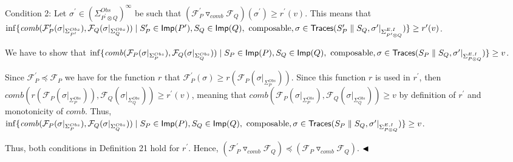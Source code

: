 \documentclass[10pt,a4paper]{article}
\begin{document}
Condition 2: Let $\sigma^{\prime}\in(\Sigma_{P^{\prime}\otimes Q}^{Obs})^{\infty}$ be such that $({{\mathcal{F}_{P}^{\prime}}\mathbin{\triangledown_{\mathit{comb}}}{\mathcal{F}_{Q}}})(\sigma^{\prime})\geq r^{\prime}(v)$. This means that $\inf\{\mathit{comb}(\mathcal{F}_{P}^{\prime}(\sigma|_{\Sigma_{P^{\prime}}^{Obs}}),\mathcal{F}_{Q}(\sigma|_{\Sigma_{Q}^{Obs}}))\mid\\
S_{P}^{\prime}\in\mathsf{Imp}(P^{\prime}),S_{Q}\in\mathsf{Imp}(Q),\text{ composable},\sigma\in\mathsf{Traces}(S_{P}^{\prime}\parallel S_{Q},\sigma^{\prime}|_{\Sigma_{P^{\prime}\otimes Q}^{E,I}})\}\geq r^{\prime}(v)$.\par
 
 
 
We have to show that $\inf\{\mathit{comb}(\mathcal{F}_{P}(\sigma|_{\Sigma_{P}^{Obs}}),\mathcal{F}_{Q}(\sigma|_{\Sigma_{Q}^{Obs}}))\mid\\
S_{P}\in\mathsf{Imp}(P),S_{Q}\in\mathsf{Imp}(Q),\text{ composable},\sigma\in\mathsf{Traces}(S_{P}\parallel S_{Q},\sigma^{\prime}|_{\Sigma_{P\otimes Q}^{E,I}})\}\geq v$.\par
 
 
 
Since $\mathcal{F}_{P}^{\prime}\preceq\mathcal{F}_{P}$ we have for the function $r$ that $\mathcal{F}_{P}^{\prime}(\sigma)\geq r(\mathcal{F}_{P}(\sigma|_{\Sigma_{P}^{Obs}}))$. Since this function $r$ is used in $r^{\prime}$, then $\mathit{comb}(r(\mathcal{F}_{P}(\sigma|_{\Sigma_{P}^{Obs}})),\mathcal{F}_{Q}(\sigma|_{\Sigma_{Q}^{Obs}}))\geq r^{\prime}(v)$, meaning that $\mathit{comb}(\mathcal{F}_{P}(\sigma|_{\Sigma_{P}^{Obs}}),\mathcal{F}_{Q}(\sigma|_{\Sigma_{Q}^{Obs}}))\geq v$ by definition of $r^{\prime}$ and monotonicity of $\mathit{comb}$. Thus, $\inf\{\mathit{comb}(\mathcal{F}_{P}(\sigma|_{\Sigma_{P}^{Obs}}),\mathcal{F}_{Q}(\sigma|_{\Sigma_{Q}^{Obs}}))\mid\\
S_{P}\in\mathsf{Imp}(P),S_{Q}\in\mathsf{Imp}(Q),\text{ composable},\sigma\in\mathsf{Traces}(S_{P}\parallel S_{Q},\sigma^{\prime}|_{\Sigma_{P\otimes Q}^{E,I}})\}\geq v$.\par
 
 
  
 
 
Thus, both conditions in Definition 21 hold for $r^{\prime}$. Hence, $({{\mathcal{F}_{P}^{\prime}}\mathbin{\triangledown_{\mathit{comb}}}{\mathcal{F}_{Q}}})\!\preceq\!({{\mathcal{F}_{P}}\mathbin{\triangledown_{\mathit{comb}}}{\mathcal{F}_{Q}}})$. $\hfill\blacktriangleleft$\par
 
\end{document}

